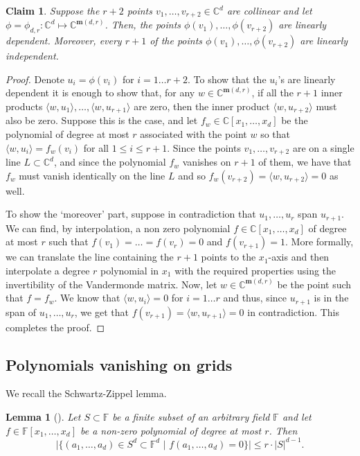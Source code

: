 \documentclass[11pt]{article}
\newtheorem{claim}[thm]{Claim}
\newtheorem{lem}[thm]{Lemma}
\def\F{{\mathbb{F}}}
\def\C{{\mathbb{C}}}
\def\m{{\mathbf{m}}}
\newcommand{\ip}[2]{\langle #1,#2 \rangle}
\begin{document}
\begin{claim}\label{cla-veronese-line}
Suppose the  $r+2$ points $v_1,\ldots,v_{r+2} \in \C^d$ are collinear and let $\phi = \phi_{d,r} : \C^d \mapsto \C^{\m(d,r)}$. Then, the points $\phi(v_1),\ldots,\phi(v_{r+2})$ are linearly dependent. Moreover, every $r+1$ of the points $\phi(v_1),\ldots,\phi(v_{r+2})$ are linearly independent.
\end{claim}
\begin{proof}
Denote $u_i = \phi(v_i)$ for $i=1\ldots r+2$. To show that the $u_i$'s are linearly dependent it is enough to show that, for any $w \in \C^{\m(d,r)}$, if all the $r+1$ inner products $\ip{w}{u_1}, \ldots, \ip{w}{u_{r+1}}$ are zero, then the inner product $\ip{w}{u_{r+2}}$ must also be zero. Suppose this is the case, and let $f_w \in \C[x_1,\ldots,x_d]$ be the polynomial of degree at most $r$ associated with the point $w$ so that $\ip{w}{u_i} = f_w(v_i)$ for all $1 \leq i \leq r+1$. Since the points $v_1,\ldots,v_{r+2}$ are on a single line $L \subset \C^d$, and since the polynomial $f_w$ vanishes on $r+1$ of them, we have that $f_w$ must vanish identically on the line $L$ and so $f_w(v_{r+2})= \ip{w}{u_{r+2}} =0$ as well. 

To show the `moreover' part, suppose in contradiction that $u_1,\ldots,u_r$ span $u_{r+1}$. We can find, by interpolation, a non zero polynomial $f \in \C[x_1,\ldots,x_d]$ of degree at most $r$ such that $f(v_1)= \ldots = f(v_r) = 0$ and $f(v_{r+1})=1$. More formally, we can translate the line containing the $r+1$ points to the $x_1$-axis and then interpolate a degree $r$ polynomial in $x_1$ with the required properties using the invertibility of the Vandermonde matrix.  Now, let $w \in \C^{\m(d,r)}$ be the point such that $f = f_w$. We  know that $\ip{w}{u_i}=0$ for $i=1\ldots r$ and thus, since $u_{r+1}$ is in the span of $u_1,\ldots,u_r$, we get that   $f(v_{r+1}) = \ip{w}{u_{r+1}}=0$ in contradiction. This completes the proof.
\end{proof}




\subsection{Polynomials vanishing on grids}

We recall the Schwartz-Zippel lemma. 

\begin{lem}[\cite{Schwartz80,Zippel79}]\label{lem-SZ}
Let $S \subset \F$ be a finite subset of an arbitrary field $\F$ and let $f \in \F[x_1,\ldots,x_d]$ be a non-zero polynomial of degree at most $r$. Then
$$   \lvert \{ (a_1,\ldots,a_d) \in S^d \subset \F^d \,\,|\,\, f(a_1,\ldots,a_d)=0 \}\rvert \leq r \cdot |S|^{d-1}. $$
\end{lem}
\end{document}
